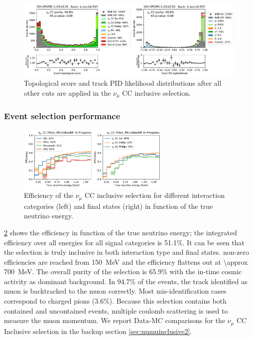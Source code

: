 \begin{figure}[]
    \centering
    \includegraphics[width=\textwidth]{NuMuCCsel/Images/run1/numu_pret_run1.pdf}
    \caption{Topological score and track PID likelihood distributions after all other cuts are applied in the $\nu_\mu$ CC inclusive selection.}
    \label{fig:numu:topo_pid}
\end{figure}



\subsubsection{Event selection performance}

\begin{figure}[H]
    \centering
    \includegraphics[width=0.65\textwidth]{NuMuCCsel/Images/run1/numu_efficiency_run1.pdf}
    \caption{Efficiency of the $\nu_\mu$ CC inclusive selection for different interaction categories (left) and final states (right) in function of the true neutrino energy. }
    \label{fig:numu:eff_r1}
\end{figure}

\cref{fig:numu:eff_r1} shows the efficiency in function of the true neutrino energy;  the integrated  efficiency over all energies for all signal categories is 51.1\%. It can be seen that the selection is truly inclusive in both interaction type and final states. non-zero efficiencies are reached from \SI{150}{\MeV} and the efficiency flattens out at \SI{\approx 700}{\MeV}. The overall purity of the selection is 65.9\% with the in-time cosmic activity as dominant background. In 94.7\% of the events, the track identified as muon is backtracked to the muon correctly. Most mis-identification cases correspond to charged pions (3.6\%). Because this selection contains both contained and uncontained events, multiple coulomb scattering is used to measure the muon momentum. We report Data-MC comparisons for the $\nu_\mu$ CC Inclusive selection in the backup section \ref{sec:numuinclusive2}. 

